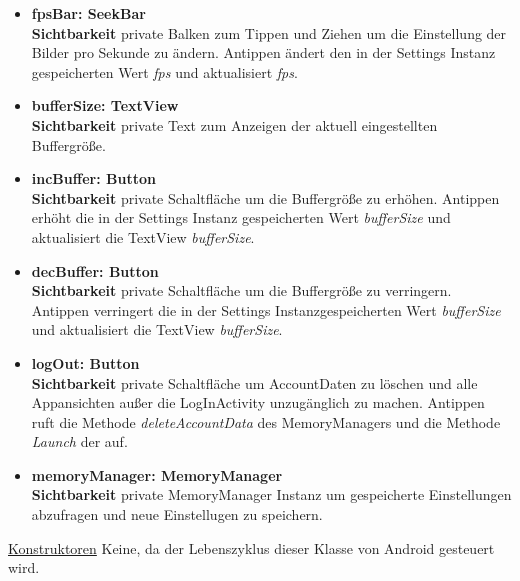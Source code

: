 \begin{itemize}
\item \textbf{fpsBar: SeekBar} \hfill\\ 
\textbf{Sichtbarkeit} private \newline
Balken zum Tippen und Ziehen um die Einstellung der  Bilder pro Sekunde zu ändern. Antippen ändert den in der Settings Instanz gespeicherten Wert \textit{fps} und aktualisiert \textit{fps}.

\item \textbf{bufferSize: TextView} \hfill\\ 
\textbf{Sichtbarkeit} private \newline
Text zum Anzeigen der aktuell eingestellten Buffergröße.

\item \textbf{incBuffer: Button} \hfill\\ 
\textbf{Sichtbarkeit} private \newline
Schaltfläche um die Buffergröße zu erhöhen. Antippen erhöht die in der Settings Instanz gespeicherten Wert \textit{bufferSize} und aktualisiert die TextView \textit{bufferSize}.

\item \textbf{decBuffer: Button} \hfill\\ 
\textbf{Sichtbarkeit} private \newline
Schaltfläche um die Buffergröße zu verringern. Antippen verringert die in der Settings Instanzgespeicherten Wert \textit{bufferSize} und aktualisiert die TextView \textit{bufferSize}.

\item \textbf{logOut: Button} \hfill\\ 
\textbf{Sichtbarkeit} private \newline
Schaltfläche um AccountDaten zu löschen und alle Appansichten außer die LogInActivity unzugänglich zu machen. Antippen ruft die Methode \textit{deleteAccountData} des MemoryManagers und die Methode \textit{Launch} der  auf.

\item \textbf{memoryManager: MemoryManager} \hfill\\ 
\textbf{Sichtbarkeit} private \newline
MemoryManager Instanz um gespeicherte Einstellungen abzufragen und neue Einstellugen zu speichern.

\end{itemize}

\underline{Konstruktoren}\newline
\indent Keine, da der Lebenszyklus dieser Klasse von Android gesteuert wird.\newline

